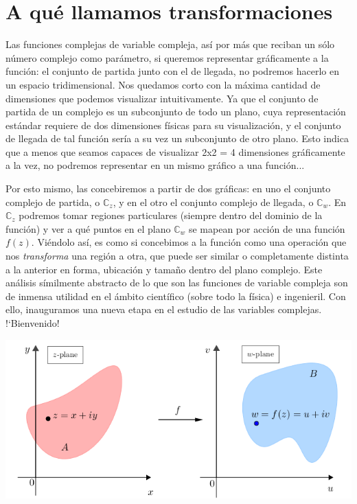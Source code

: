 \documentclass[12pt]{article}
\theoremstyle{definition}
\theoremstyle{theorem}
\theoremstyle{corolary}
\begin{document}
\section{A qu\'e llamamos transformaciones}
Las funciones complejas de variable compleja, as\'i por m\'as que reciban un s\'olo n\'umero complejo como par\'ametro, si queremos representar gr\'aficamente a la funci\'on: el conjunto de partida junto con el de llegada, no podremos hacerlo en un espacio tridimensional. Nos quedamos corto con la m\'axima cantidad de dimensiones que podemos visualizar intuitivamente. Ya que el conjunto de partida de un complejo es un subconjunto de todo un plano, cuya representaci\'on est\'andar requiere de dos dimensiones f\'isicas para su visualizaci\'on, y el conjunto de llegada de tal funci\'on ser\'ia a su vez un subconjunto de otro plano. Esto indica que a menos que seamos capaces de visualizar 2x2 = 4 dimensiones gr\'aficamente a la vez, no podremos representar en un mismo gr\'afico a una funci\'on...

Por esto mismo, las concebiremos a partir de dos gr\'aficas: en uno el conjunto complejo de partida, o $\mathbb{C}_z$, y en el otro el conjunto complejo de llegada, o $\mathbb{C}_w$. En  $\mathbb{C}_z$ podremos tomar regiones particulares (siempre dentro del dominio de la funci\'on) y ver a qu\'e puntos en el plano $\mathbb{C}_w$ se mapean por acci\'on de una funci\'on $f(z)$. Vi\'endolo as\'i, es como si concebimos a la funci\'on como una operaci\'on que nos \textit{transforma} una regi\'on a otra, que puede ser similar o completamente distinta a la anterior en forma, ubicaci\'on y tama\~no dentro del plano complejo. Este an\'alisis s\'imilmente abstracto de lo que son las funciones de variable compleja son de inmensa utilidad en el \'ambito cient\'ifico (sobre todo la f\'isica) e ingenieril. Con ello, inauguramos una nueva etapa en el estudio de las variables complejas. !`Bienvenido!\\

\begin{center}
	\includegraphics[scale=0.7]{transformacion.png}
\end{center}
\end{document}
